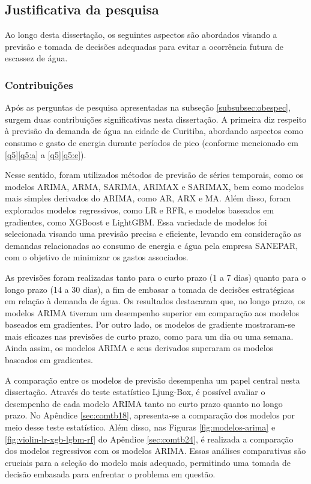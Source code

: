 \subsection{Justificativa da pesquisa} \label{subsec:justif}

Ao longo desta dissertação, os seguintes aspectos são abordados visando a previsão e tomada de decisões adequadas para evitar a ocorrência futura de escassez de água.

\subsubsection{Contribui\c c\~oes} \label{subsubsec:Contribuição}

Após as perguntas de pesquisa apresentadas na subseção \ref{subsubsec:obespec}, surgem duas contribuições significativas nesta dissertação. A primeira diz respeito à previsão da demanda de água na cidade de Curitiba, abordando aspectos como consumo e gasto de energia durante períodos de pico (conforme mencionado em \ref{q5}\ref{q5:a} a \ref{q5}\ref{q5:e}).

Nesse sentido, foram utilizados métodos de previsão de séries temporais, como os modelos ARIMA, ARMA, SARIMA, ARIMAX e SARIMAX, bem como modelos mais simples derivados do ARIMA, como AR, ARX e MA. Além disso, foram explorados modelos regressivos, como LR e RFR, e modelos baseados em gradientes, como XGBoost e LightGBM. Essa variedade de modelos foi selecionada visando uma previsão precisa e eficiente, levando em consideração as demandas relacionadas ao consumo de energia e água pela empresa SANEPAR, com o objetivo de minimizar os gastos associados.

As previsões foram realizadas tanto para o curto prazo (1 a 7 dias) quanto para o longo prazo (14 a 30 dias), a fim de embasar a tomada de decisões estratégicas em relação à demanda de água. Os resultados destacaram que, no longo prazo, os modelos ARIMA tiveram um desempenho superior em comparação aos modelos baseados em gradientes. Por outro lado, os modelos de gradiente mostraram-se mais eficazes nas previsões de curto prazo, como para um dia ou uma semana. Ainda assim, os modelos ARIMA e seus derivados superaram os modelos baseados em gradientes.

A comparação entre os modelos de previsão desempenha um papel central nesta dissertação. Através do teste estatístico Ljung-Box, é possível avaliar o desempenho de cada modelo ARIMA tanto no curto prazo quanto no longo prazo. No Apêndice \ref{sec:comtb18}, apresenta-se a comparação dos modelos por meio desse teste estatístico. Além disso, nas Figuras \ref{fig:modelos-arima} e \ref{fig:violin-lr-xgb-lgbm-rf} do Apêndice \ref{sec:comtb24}, é realizada a comparação dos modelos regressivos com os modelos ARIMA. Essas análises comparativas são cruciais para a seleção do modelo mais adequado, permitindo uma tomada de decisão embasada para enfrentar o problema em questão.





